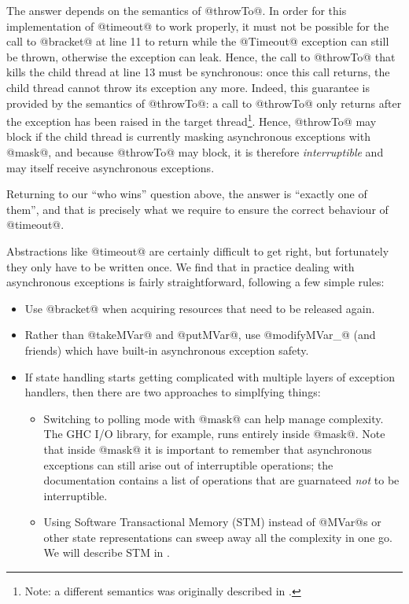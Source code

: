 The answer depends on the semantics of @throwTo@.  In order for this
implementation of @timeout@ to work properly, it must not be possible
for the call to @bracket@ at line 11 to return while the @Timeout@
exception can still be thrown, otherwise the exception can leak.
Hence, the call to @throwTo@ that kills the child thread at line 13
must be synchronous: once this call returns, the child thread cannot
throw its exception any more.  Indeed, this guarantee is provided by
the semantics of @throwTo@: a call to @throwTo@ only returns after the
exception has been raised in the target thread\footnote{Note: a
  different semantics was originally described in
  \citet{spj:asynch-exceptions}.}.  Hence, @throwTo@ may block if the
child thread is currently masking asynchronous exceptions with @mask@,
and because @throwTo@ may block, it is therefore \emph{interruptible}
and may itself receive asynchronous exceptions.

Returning to our ``who wins'' question above, the answer is ``exactly
one of them'', and that is precisely what we require to ensure the
correct behaviour of @timeout@.


Abstractions like @timeout@ are certainly difficult to get right, but
fortunately they only have to be written once.  We find that in
practice dealing with asynchronous exceptions is fairly
straightforward, following a few simple rules:

\begin{itemize}
\item Use @bracket@ when acquiring resources that need to be released
  again.
\item Rather than @takeMVar@ and @putMVar@, use @modifyMVar_@ (and
  friends) which have built-in asynchronous exception safety.
\item If state handling starts getting complicated with multiple
  layers of exception handlers, then there are two approaches to
  simplfying things:
  \begin{itemize}
    \item Switching to polling mode with @mask@ can help manage
      complexity.  The GHC I/O library, for example, runs entirely
      inside @mask@.  Note that inside @mask@ it is important to
      remember that asynchronous exceptions can still arise out of
      interruptible operations; the documentation contains a list of
      operations that are guarnateed \emph{not} to be interruptible.
    \item Using Software Transactional Memory (STM) instead of @MVar@s
      or other state representations can sweep away all the complexity
      in one go.  We will describe STM in .
  \end{itemize}
\end{itemize}

